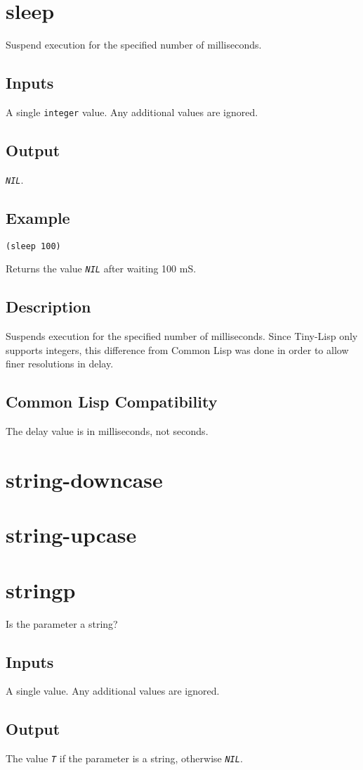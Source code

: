\documentclass[10pt, openany]{book}
\newcommand{\constant}[1]{\emph{\texttt{#1}}}
\newcommand{\datatype}[1]{\texttt{#1}}
\newcommand{\tl}{Tiny-Lisp}
\newcommand{\cl}{Common Lisp}
\begin{document}
\section{sleep}
Suspend execution for the specified number of milliseconds.
\subsection{Inputs}
A single \datatype{integer} value.  Any additional values are ignored.
\subsection{Output}
\constant{NIL}.
\subsection{Example}
\begin{lstlisting}
(sleep 100)
\end{lstlisting}
Returns the value \constant{NIL} after waiting 100 mS.
\subsection{Description}
Suspends execution for the specified number of milliseconds.  Since \tl{} only supports integers, this difference from \cl{} was done in order to allow finer resolutions in delay.
\subsection{Common Lisp Compatibility}
The delay value is in milliseconds, not seconds.

\section{string-downcase}
\section{string-upcase}

\section{stringp}
Is the parameter a string?
\subsection{Inputs}
A single value.  Any additional values are ignored.
\subsection{Output}
The value \constant{T} if the parameter is a string, otherwise \constant{NIL}.
\end{document}
